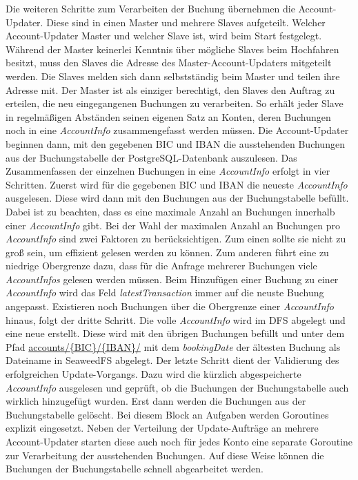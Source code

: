 \documentclass[12pt,oneside,a4paper,parskip]{scrbook}
\begin{document}
Die weiteren Schritte zum Verarbeiten der Buchung übernehmen die Account-Updater. Diese sind in einen Master und mehrere Slaves aufgeteilt. Welcher Account-Updater Master und welcher Slave ist, wird beim Start festgelegt. Während der Master keinerlei Kenntnis über mögliche Slaves beim Hochfahren besitzt, muss den Slaves die  Adresse des Master-Account-Updaters mitgeteilt werden. Die Slaves melden sich dann selbstständig beim Master und teilen ihre Adresse mit. Der Master ist als einziger berechtigt, den Slaves den Auftrag zu erteilen, die neu eingegangenen Buchungen zu verarbeiten. So  erhält jeder Slave in regelmäßigen Abständen seinen eigenen Satz an Konten, deren Buchungen noch in eine \textit{AccountInfo} zusammengefasst werden müssen. Die Account-Updater beginnen dann, mit den gegebenen BIC und IBAN die ausstehenden Buchungen aus der Buchungstabelle der PostgreSQL-Datenbank auszulesen. Das Zusammenfassen der einzelnen Buchungen in eine \textit{AccountInfo} erfolgt in vier Schritten. Zuerst wird für die gegebenen BIC und IBAN die neueste \textit{AccountInfo} ausgelesen. Diese wird dann mit den Buchungen aus der Buchungstabelle befüllt. Dabei ist zu beachten, dass es eine maximale Anzahl an Buchungen innerhalb einer \textit{AccountInfo} gibt. Bei der Wahl der maximalen Anzahl an Buchungen pro \textit{AccountInfo} sind zwei Faktoren zu berücksichtigen. Zum einen sollte sie nicht zu groß sein, um effizient gelesen werden zu können. Zum anderen führt eine zu niedrige Obergrenze dazu, dass für die Anfrage mehrerer Buchungen viele \textit{AccountInfos} gelesen werden müssen. Beim Hinzufügen einer Buchung zu einer \textit{AccountInfo} wird das Feld \textit{latestTransaction} immer auf die neuste Buchung angepasst. Existieren noch Buchungen über die Obergrenze einer \textit{AccountInfo} hinaus, folgt der dritte Schritt. Die volle \textit{AccountInfo} wird im DFS abgelegt und eine neue erstellt. Diese wird mit den übrigen Buchungen befüllt und unter dem Pfad \url{accounts/{BIC}/{IBAN}/} mit dem \textit{bookingDate} der ältesten Buchung als Dateiname in SeaweedFS abgelegt. Der letzte Schritt dient der Validierung des erfolgreichen Update-Vorgangs. Dazu wird die kürzlich abgespeicherte \textit{AccountInfo} ausgelesen und geprüft, ob die Buchungen der Buchungstabelle auch wirklich hinzugefügt wurden. Erst dann werden die Buchungen aus der Buchungstabelle gelöscht. Bei diesem Block an Aufgaben werden Goroutines explizit eingesetzt. Neben der Verteilung der Update-Aufträge an mehrere Account-Updater starten diese auch noch für jedes Konto eine separate Goroutine zur Verarbeitung der ausstehenden Buchungen. Auf diese Weise können die Buchungen der Buchungstabelle schnell abgearbeitet werden.
\end{document}
